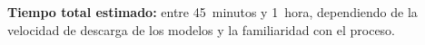 \bigskip
\noindent\textbf{Tiempo total estimado:} entre 45~minutos y 1~hora, dependiendo de la velocidad de descarga de los modelos y la familiaridad con el proceso.

